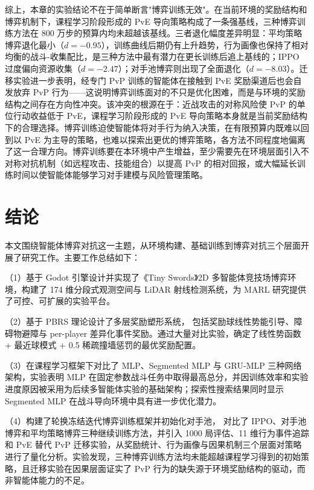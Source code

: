 \documentclass[12pt, a4paper, UTF8]{ctexart}
\numberwithin{equation}{section}
\begin{document}
综上，本章的实验结论不在于简单断言"博弈训练无效"。在当前环境的奖励结构和博弈机制下，课程学习阶段形成的 PvE 导向策略构成了一条强基线，三种博弈训练方法在 800 万步的预算内均未超越该基线。三者退化幅度差异明显：平均策略博弈退化最小（$d=-0.95$），训练曲线后期仍有上升趋势，行为画像也保持了相对均衡的战斗-收集配比，是三种方法中最有潜力在更长训练后追上基线的；IPPO 过度偏向资源收集（$d=-2.47$）；对手池博弈则出现了全面退化（$d=-8.03$）。迁移实验进一步表明，经专门 PvP 训练的智能体在接触到 PvE 奖励渠道后也会自发放弃 PvP 行为——这说明博弈训练面对的不只是优化困难，而是与环境的奖励结构之间存在方向性冲突。该冲突的根源在于：近战攻击的对称风险使 PvP 的单位行动收益低于 PvE，课程学习阶段形成的 PvE 导向策略本身就是当前奖励结构下的合理选择。博弈训练迫使智能体将对手行为纳入决策，在有限预算内既难以回到以 PvE 为主导的策略，也难以探索出更优的博弈策略，各方法不同程度地偏离了这一合理方向。博弈训练要在本环境中产生增益，至少需要先在环境层面引入不对称对抗机制（如远程攻击、技能组合）以提高 PvP 的相对回报，或大幅延长训练时间以使智能体能够学习对手建模与风险管理策略。

\section*{结\quad\quad 论}

本文围绕智能体博弈对抗这一主题，从环境构建、基础训练到博弈对抗三个层面开展了研究工作。主要工作总结如下：

（1）基于 Godot 引擎设计并实现了《Tiny Swords》2D 多智能体竞技场博弈环境，构建了 174 维分段式观测空间与 LiDAR 射线检测系统，为 MARL 研究提供了可控、可扩展的实验平台。

（2）基于 PBRS 理论设计了多层奖励塑形系统，
包括奖励球线性势能引导、障碍物避障与 per-player 差异化事件奖励。通过大量对比实验，确定了线性势函数 + 最近球模式 + 0.5 稀疏撞墙惩罚的最优奖励配置。

（3）在课程学习框架下对比了 MLP、Segmented MLP 与 GRU-MLP 三种网络架构，实验表明 MLP 在固定参数战斗任务中取得最高总分，并因训练效率和实验进度原因被采用为后续多智能体实验的基础架构；探索性搜索结果同时显示 Segmented MLP 在战斗导向环境中具有进一步优化潜力。

（4）构建了轮换冻结迭代博弈训练框架并初始化对手池，
对比了 IPPO、对手池博弈和平均策略博弈三种继续训练方法，并引入 1000 局评估、11 维行为事件追踪和 PvE 替代 PvP 迁移实验，从奖励统计、行为画像与因果机制三个层面对策略进行了量化分析。实验发现，三种博弈训练方法均未能超越课程学习得到的初始策略，且迁移实验在因果层面证实了 PvP 行为的缺失源于环境奖励结构的驱动，而非智能体能力的不足。
\end{document}
